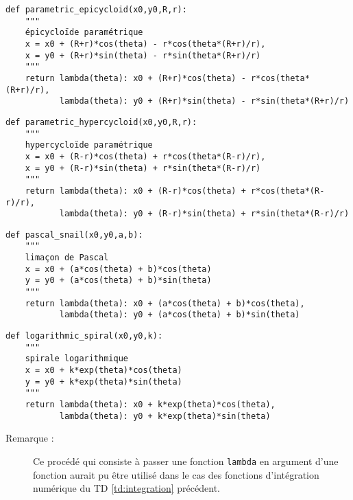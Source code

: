 \begin{description}
	
	\begin{py}{15cm}
	\begin{lstlisting}[title={\bf Epicycloïde paramétrique}]
def parametric_epicycloid(x0,y0,R,r):
    """
    épicycloïde paramétrique
    x = x0 + (R+r)*cos(theta) - r*cos(theta*(R+r)/r),
    x = y0 + (R+r)*sin(theta) - r*sin(theta*(R+r)/r)
    """
    return lambda(theta): x0 + (R+r)*cos(theta) - r*cos(theta*(R+r)/r),
           lambda(theta): y0 + (R+r)*sin(theta) - r*sin(theta*(R+r)/r)
	\end{lstlisting}
	\end{py}

	
	\begin{py}{15cm}
	\begin{lstlisting}[title={\bf Hypercycloïde paramétrique}]
def parametric_hypercycloid(x0,y0,R,r):
    """
    hypercycloïde paramétrique
    x = x0 + (R-r)*cos(theta) + r*cos(theta*(R-r)/r),
    x = y0 + (R-r)*sin(theta) + r*sin(theta*(R-r)/r)
    """
    return lambda(theta): x0 + (R-r)*cos(theta) + r*cos(theta*(R-r)/r),
           lambda(theta): y0 + (R-r)*sin(theta) + r*sin(theta*(R-r)/r)
	\end{lstlisting}
	\end{py}

	
	\begin{py}{15cm}
	\begin{lstlisting}[title={\bf Limaçon de Pascal}]
def pascal_snail(x0,y0,a,b):
    """
    limaçon de Pascal
    x = x0 + (a*cos(theta) + b)*cos(theta)
    y = y0 + (a*cos(theta) + b)*sin(theta)
    """
    return lambda(theta): x0 + (a*cos(theta) + b)*cos(theta),
           lambda(theta): y0 + (a*cos(theta) + b)*sin(theta)
	\end{lstlisting}
	\end{py}

	
	\begin{py}{15cm}
	\begin{lstlisting}[title={\bf Spirale logarithmique}]
def logarithmic_spiral(x0,y0,k):
    """
    spirale logarithmique
    x = x0 + k*exp(theta)*cos(theta)
    y = y0 + k*exp(theta)*sin(theta)
    """
    return lambda(theta): x0 + k*exp(theta)*cos(theta),
           lambda(theta): y0 + k*exp(theta)*sin(theta)
	\end{lstlisting}
	\end{py}

	\begin{description}
	\item[Remarque :] Ce procédé qui consiste à passer une fonction {\tt lambda}
		en argument d'une fonction aurait pu être utilisé dans le cas des
		fonctions d'intégration numérique du TD \ref{td:integration} 
		précédent.


\end{description}
\end{description}
